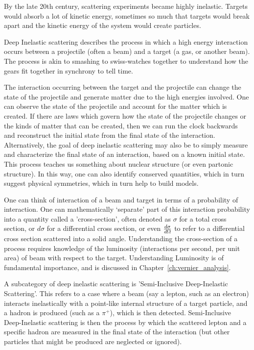 By the late 20th century, scattering experiments became highly inelastic.
Targets would absorb a lot of kinetic energy, sometimes so much that targets
would break apart and the kinetic energy of the system would create particles.

Deep Inelastic scattering describes the process in which a high energy
interaction occurs between a projectile (often a beam) and a target (a gas, or
another beam). The process is akin to smashing to swiss-watches together to
understand how the gears fit together in synchrony to tell time. 

The interaction occurring between the target and the projectile can change the
state of the projectile and generate matter due to the high energies involved.
One can observe the state of the projectile and account for the matter which is
created.  If there are laws which govern how the state of the projectile changes
or the kinds of matter that can be created, then we can run the clock backwards
and reconstruct the initial state from the final state of the interaction.
Alternatively, the goal of deep inelastic scattering may also be to simply
measure and characterize the final state of an interaction, based on a known
initial state. This process teaches us something about nuclear structure (or
even partonic structure). In this way, one can also identify conserved
quantities, which in turn suggest physical symmetries, which in turn help to
build models.

One can think of interaction of a beam and target in terms of a probability of
interaction. One can mathematically `separate' part of this interaction
probability into a quantity called a 'cross-section', often denoted as $\sigma$
for a total cross section, or $d\sigma$ for a differential cross section, or
even ${d\sigma}\over{d\Omega}$ to refer to a differential cross section
scattered into a solid angle. Understanding the cross-section of a process
requires knowledge of the luminosity (interactions per second, per unit area) of
beam with respect to the target. Understanding Luminosity is of fundamental
importance, and is discussed in Chapter~\ref{ch:vernier_analysis}.

A subcategory of deep inelastic scattering is 'Semi-Inclusive Deep-Inelastic
Scattering'. This refers to a case where a beam (say a lepton, such as an
electron) interacts inelastically with a point-like internal structure of a
target particle, and a hadron is produced (such as a $\pi^+$), which is then
detected. Semi-Inclusive Deep-Inelastic scattering is then the process by which
the scattered lepton and a specific hadron are measured in the final state of
the interaction (but other particles that might be produced are neglected or
ignored).

